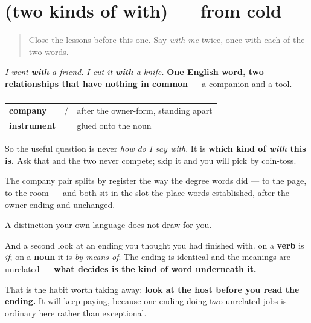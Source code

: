 \section[(two kinds of with)]{(two kinds of with) — from cold}

\label{lesson:ML-R86-with-recall}



\begin{quote}
Close the lessons before this one. Say \emph{with me} twice, once with each of the two words.
\end{quote}

\begin{grammarlens}[title={Grammar Lens: English asks one question, Malayalam asks two}]
\emph{I went \textbf{with} a friend.} \emph{I cut it \textbf{with} a knife.} \textbf{One English word, two relationships that have nothing in common} — a companion and a tool.

\noindent
\begin{tabularx}{\linewidth}{@{}>{\raggedright\arraybackslash}X>{\raggedright\arraybackslash}X>{\raggedright\arraybackslash}X@{}}
\toprule
\textbf{} & \textbf{} & \textbf{} \\
\midrule
\textbf{company} & \textbf{\ml{എന്റെ} \ml{ഒപ്പം}} / \textbf{\ml{എന്റെ} \ml{കൂടെ}} & after the owner-form, standing apart \\
\textbf{instrument} & \textbf{\ml{കത്തിയാൽ}} & glued onto the noun \\
\bottomrule
\end{tabularx}

So the useful question is never \emph{how do I say with}. It is \textbf{which kind of \emph{with} this is.} Ask that and the two never compete; skip it and you will pick by coin-toss.

The company pair splits by register the way the degree words did — \textbf{} to the page, \textbf{} to the room — and both sit in the slot the place-words established, after the owner-ending and unchanged.
\end{grammarlens}

\begin{grammarlens}[title={What you've built}]
A distinction your own language does not draw for you.

And a second look at an ending you thought you had finished with. \textbf{} on a \textbf{verb} is \emph{if}; on a \textbf{noun} it is \emph{by means of}. The ending is identical and the meanings are unrelated — \textbf{what decides is the kind of word underneath it.}

That is the habit worth taking away: \textbf{look at the host before you read the ending.} It will keep paying, because one ending doing two unrelated jobs is ordinary here rather than exceptional.
\end{grammarlens}


